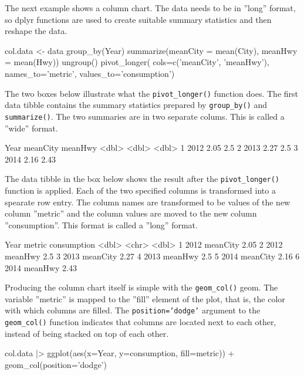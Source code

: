 The next example shows a column chart. The data needs to be in ''long'' format, so dplyr functions are used to create suitable summary statistics and then reshape the data. 

\begin{Rcode}
col.data <- data %
   group_by(Year) %
   summarize(meanCity = mean(City), meanHwy = mean(Hwy)) %
   ungroup() %
   pivot_longer(
     cols=c('meanCity', 'meanHwy'), 
     names_to='metric', 
     values_to='consumption')
\end{Rcode}

The two boxes below illustrate what the \texttt{pivot\_longer()} function does. The first data tibble contains the summary statistics prepared by \texttt{group\_by()} and \texttt{summarize()}. The two summaries are in two separate colums. This is called a ''wide'' format. 

\begin{textcode}
   Year meanCity meanHwy
  <dbl>    <dbl>   <dbl>
1  2012     2.05    2.5 
2  2013     2.27    2.5 
3  2014     2.16    2.43
\end{textcode}

The data tibble in the box below shows the result after the \texttt{pivot\_longer()} function is applied. Each of the two specified columns is transformed into a spearate row entry. The column names are transformed to be values of the new column ''metric'' and the column values are moved to the new column ''consumption''. This format is called a ''long'' format.

\begin{textcode}
   Year metric   consumption
  <dbl> <chr>          <dbl>
1  2012 meanCity        2.05
2  2012 meanHwy         2.5 
3  2013 meanCity        2.27
4  2013 meanHwy         2.5 
5  2014 meanCity        2.16
6  2014 meanHwy         2.43
\end{textcode}

Producing the column chart itself is simple with the \texttt{geom\_col()} geom. The variable ''metric'' is mapped to the ''fill'' element of the plot, that is, the color with which columns are filled. The \texttt{position='dodge'} argument to the \texttt{geom\_col()} function indicates that columns are located next to each other, instead of being stacked on top of each other. 

\begin{Rcode}
col.data |> 
   ggplot(aes(x=Year, y=consumption, fill=metric)) +
      geom_col(position='dodge')
\end{Rcode}

